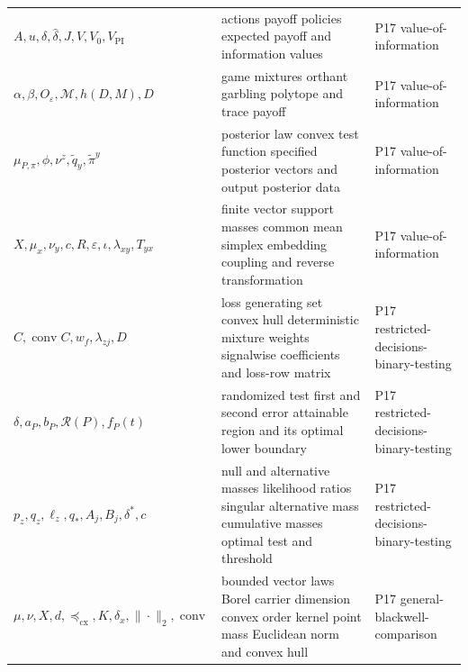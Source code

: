 \begin{longtable}{@{}p{}p{}p{}@{}}
\(A,\allowbreak u,\allowbreak \delta,\allowbreak \widehat\delta,\allowbreak J,\allowbreak V,\allowbreak V_0,\allowbreak V_{\mathrm{PI}}\) & actions payoff policies expected payoff and information values & P17 value-\allowbreak{}of-\allowbreak{}information \\
\(\alpha,\allowbreak \beta,\allowbreak O_\varepsilon,\allowbreak \mathcal M,\allowbreak h(D,\allowbreak M),\allowbreak D\) & game mixtures orthant garbling polytope and trace payoff & P17 value-\allowbreak{}of-\allowbreak{}information \\
\(\mu_{P,\pi},\allowbreak \phi,\allowbreak \nu^z,\allowbreak \widetilde q_y,\allowbreak \widetilde\pi^y\) & posterior law convex test function specified posterior vectors and output posterior data & P17 value-\allowbreak{}of-\allowbreak{}information \\
\(X,\allowbreak \mu_x,\allowbreak \nu_y,\allowbreak c,\allowbreak R,\allowbreak \varepsilon,\allowbreak \iota,\allowbreak \lambda_{xy},\allowbreak T_{yx}\) & finite vector support masses common mean simplex embedding coupling and reverse transformation & P17 value-\allowbreak{}of-\allowbreak{}information \\
\(C,\allowbreak \operatorname{conv}C,\allowbreak w_f,\allowbreak \lambda_{zj},\allowbreak D\) & loss generating set convex hull deterministic mixture weights signalwise coefficients and loss-row matrix & P17 restricted-\allowbreak{}decisions-\allowbreak{}binary-\allowbreak{}testing \\
\(\delta,\allowbreak a_P,\allowbreak b_P,\allowbreak \mathcal R(P),\allowbreak f_P(t)\) & randomized test first and second error attainable region and its optimal lower boundary & P17 restricted-\allowbreak{}decisions-\allowbreak{}binary-\allowbreak{}testing \\
\(p_z,\allowbreak q_z,\allowbreak \ell_z,\allowbreak q_*,\allowbreak A_j,\allowbreak B_j,\allowbreak \delta^*,\allowbreak c\) & null and alternative masses likelihood ratios singular alternative mass cumulative masses optimal test and threshold & P17 restricted-\allowbreak{}decisions-\allowbreak{}binary-\allowbreak{}testing \\
\(\mu,\allowbreak \nu,\allowbreak X,\allowbreak d,\allowbreak \preceq_{\mathrm{cx}},\allowbreak K,\allowbreak \delta_x,\allowbreak \|\cdot\|_2,\allowbreak \operatorname{conv}\) & bounded vector laws Borel carrier dimension convex order kernel point mass Euclidean norm and convex hull & P17 general-\allowbreak{}blackwell-\allowbreak{}comparison \\

\end{longtable}
